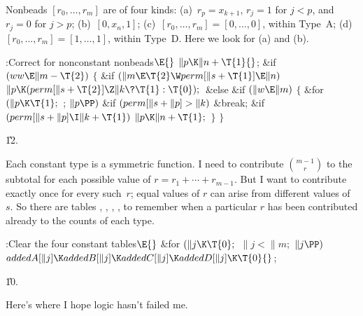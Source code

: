 Nonbeads $[r_0,\ldots,r_m]$ are of four kinds:
(a)~$r_p=x_{k+1}$,
$r_j=1$ for $j<p$, and $r_j=0$ for $j>p$; (b)~$[0,x_n,1]$;
(c)~$[r_0,\ldots,r_m]=[0,\ldots,0]$, within Type~A;
(d)~$[r_0,\ldots,r_m]=[1,\ldots,1]$, within Type~D.
Here we look for (a) and (b).

\Y\B\4:Correct for nonconstant nonbeads\X${}\E{}$\6
$\|p\K\|n+\T{1}{}$;\6
\&{if} ${}(\\{ww}\E\|m-\T{2}){}$\5
${}\{{}$\1\6
\&{if} ${}(\|m\E\T{2}\W\\{perm}[\|s+\T{1}]\E\|n){}$\1\5
${}\|p\K(\\{perm}[\|s+\T{2}]\Z\|k\?\T{1}:\T{0});{}$\2\6
\&{else} \&{if} ${}(\|w\E\|m){}$\5
${}\{{}$\1\6
\&{for} ${}(\|p\K\T{1};{}$  ; ${}\|p\PP){}$\1\6
\&{if} ${}(\\{perm}[\|s+\|p]>\|k){}$\1\5
\&{break};\2\2\6
\&{if} ${}(\\{perm}[\|s+\|p]\I\|k+\T{1}){}$\1\5
${}\|p\K\|n+\T{1};{}$\2\6
\4${}\}{}$\2\6
\4${}\}{}$\2\par
\U12.\fi

Each constant type is a symmetric function. I need to
contribute
$m-1\choose r$ to the subtotal for each possible value of
$r=r_1+\cdots+r_{m-1}$. But I want to contribute exactly once for
every such~$r$; equal values of $r$ can arise from different values of~$s$.
So there are tables , , , , to remember
when a particular $r$ has been contributed already to the counts of
each type.

\Y\B\4:Clear the four constant tables\X${}\E{}$\6
\&{for} ${}(\|j\K\T{0};{}$ ${}\|j<\|m;{}$ ${}\|j\PP){}$\1\5
${}\\{addedA}[\|j]\K\\{addedB}[\|j]\K\\{addedC}[\|j]\K\\{addedD}[\|j]\K%
\T{0}{}$;\2\par
\U10.\fi

Here's where I hope logic hasn't failed me.

